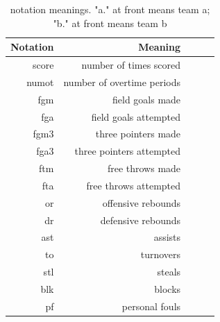 \documentclass{article} %
\begin{document}
\begin{table}[H]
\centering
{\small
\begin{tabular}{rrrrr}
  \hline
 Notation & Meaning \\ 
  \hline
  score & number of times scored \\
  numot & number of overtime periods \\
  fgm  & field goals made \\ 
  fga  & field goals attempted \\ 
  fgm3 &  three pointers made \\ 
  fga3 &  three pointers attempted \\ 
  ftm &  free throws made \\ 
  fta &  free throws attempted \\
  or & offensive rebounds \\
  dr & defensive rebounds \\
  ast & assists \\
  to & turnovers \\
  stl &  steals \\
  blk & blocks \\
  pf & personal fouls \\
   \hline
\end{tabular}
}
\caption{notation meanings. "a." at front means team a; "b." at front means team b} 
\end{table}
\end{document}
